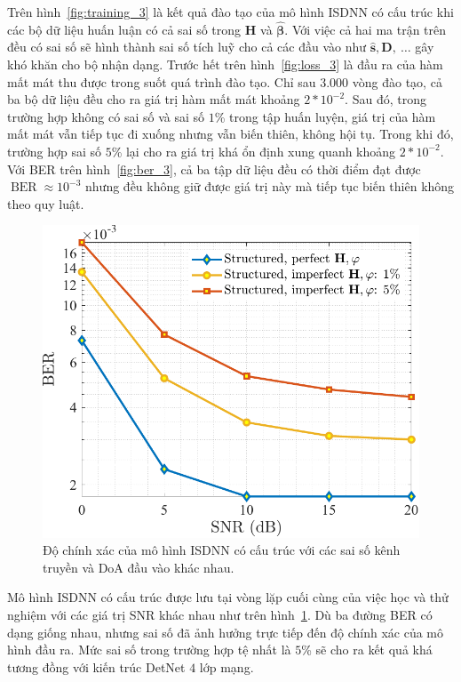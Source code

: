 Trên hình~\ref{fig:training_3} là kết quả đào tạo của mô hình ISDNN có cấu trúc khi các bộ dữ liệu huấn luận có cả sai số trong $\mathbf{H}$ và $\hat{\boldsymbol{\beta}}$. Với việc cả hai ma trận trên đều có sai số sẽ hình thành sai số tích luỹ cho cả các đầu vào như $\hat{\mathbf{s}}, \mathbf{D},~\ldots$ gây khó khăn cho bộ nhận dạng. Trước hết trên hình~\ref{fig:loss_3} là đầu ra của hàm mất mát thu được trong suốt quá trình đào tạo. Chỉ sau $3.000$ vòng đào tạo, cả ba bộ dữ liệu đều cho ra giá trị hàm mất mát khoảng $2*10^{-2}$. Sau đó, trong trường hợp không có sai số và sai số $1$\% trong tập huấn luyện, giá trị của hàm mất mát vẫn tiếp tục đi xuống nhưng vẫn biến thiên, không hội tụ. Trong khi đó, trường hợp sai số $5$\% lại cho ra giá trị khá ổn định xung quanh khoảng $2*10^{-2}$. Với BER trên hình~\ref{fig:ber_3}, cả ba tập dữ liệu đều có thời điểm đạt được $\operatorname{BER} \approx 10^{-3}$ nhưng đều không giữ được giá trị này mà tiếp tục biến thiên không theo quy luật.
\begin{figure}[htb]
    \centering
    \includegraphics[width=\linewidth]{figures/performance_3.pdf}
    \caption{Độ chính xác của mô hình ISDNN có cấu trúc với các sai số kênh truyền và DoA đầu vào khác nhau.}
    \label{fig:isdnn_3}
\end{figure}

Mô hình ISDNN có cấu trúc được lưu tại vòng lặp cuối cùng của việc học và thử nghiệm với các giá trị SNR khác nhau như trên hình~\ref{fig:isdnn_3}. Dù ba đường BER có dạng giống nhau, nhưng sai số đã ảnh hưởng trực tiếp đến độ chính xác của mô hình đầu ra. Mức sai số trong trường hợp tệ nhất là $5$\% sẽ cho ra kết quả khá tương đồng với kiến trúc DetNet $4$ lớp mạng.
